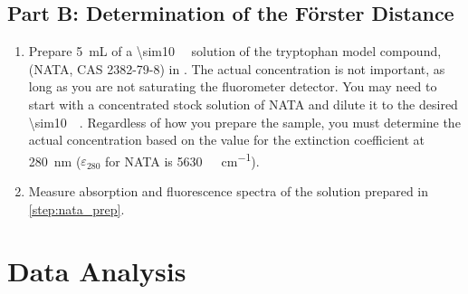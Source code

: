 
\subsection{Part B: Determination of the Förster Distance} %
\label{sub:part_b_determination_of_the_forster_distance}

\begin{enumerate}
	\item Prepare \SI{5}{\mL} of a \SI{\sim10}{\micro\Molar} solution of the tryptophan model compound,  (NATA, CAS 2382-79-8) in . 
	The actual concentration is not important, as long as you are not saturating the fluorometer detector. 
	You may need to start with a concentrated stock solution of NATA and dilute it to the desired \SI{\sim10}{\micro\Molar}. 
	Regardless of how you prepare the sample, you must determine the actual concentration based on the value for the extinction coefficient at \SI{280}{\nm} (\( \varepsilon_{280} \) for NATA is \SI{5630}{\per\Molar\per\cm}).
	\label{step:nata_prep}
	\item Measure absorption and fluorescence spectra of the solution prepared in \cref{step:nata_prep}.
	\label{step:nata_spectrum} 
\end{enumerate}


\section{Data Analysis} %
\label{sec:data_analysis}

